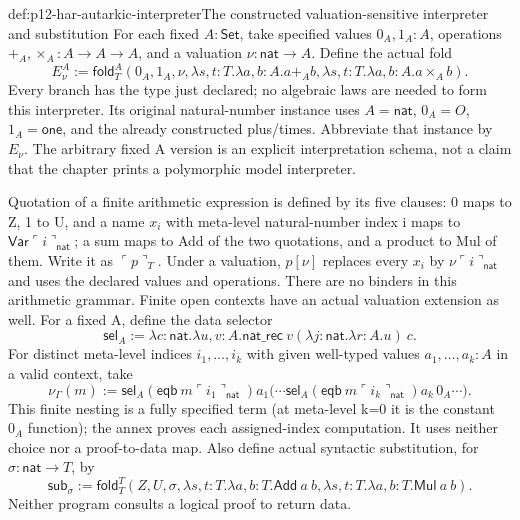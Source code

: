 \begin{hbdefinition}{def:p12-har-autarkic-interpreter}{The constructed valuation-sensitive interpreter and substitution}
For each fixed \(A:\mathsf{Set}\), take specified values
\(0_A,1_A:A\), operations \(+_A,\times_A:A\to A\to A\),
and a valuation \(\nu:\mathsf{nat}\to A\). Define the actual fold
\[
 E_\nu^A:=\mathsf{fold}_T^A
   (0_A,1_A,\nu,
    \lambda s,t:T.\lambda a,b:A.a+_A b,
    \lambda s,t:T.\lambda a,b:A.a\times_A b).
\]
Every branch has the type just declared; no algebraic laws are needed
to form this interpreter. Its original natural-number instance uses
\(A=\mathsf{nat}\), \(0_A=O\), \(1_A=\mathsf{one}\), and the
already constructed plus/times. Abbreviate that instance by \(E_\nu\).
The arbitrary fixed A version is an explicit interpretation schema,
not a claim that the chapter prints a polymorphic model interpreter.

Quotation of a finite arithmetic expression is defined by its five
clauses: 0 maps to Z, 1 to U, and a name \(x_i\) with meta-level
natural-number index i maps to
\(\mathsf{Var}\ulcorner i\urcorner_{\mathsf{nat}}\);
a sum maps to Add of the two quotations, and a product to Mul of them. Write it
as \(\ulcorner p\urcorner_T\). Under a valuation, \(p[\nu]\)
replaces every \(x_i\) by
\(\nu\ulcorner i\urcorner_{\mathsf{nat}}\) and uses the declared values
and operations. There are no binders in this arithmetic grammar.
Finite open contexts have an actual valuation extension as well. For a
fixed A, define the data selector
\[
 \mathsf{sel}_A:=\lambda c:\mathsf{nat}.\lambda u,v:A.
      \mathsf{nat\_rec}\ v
        (\lambda j:\mathsf{nat}.\lambda r:A.u)\ c.
\]
For distinct meta-level indices \(i_1,\ldots,i_k\) with given
well-typed values \(a_1,\ldots,a_k:A\) in a valid context, take
\[
 \nu_\Gamma(m):=
  \mathsf{sel}_A(\mathsf{eqb}\ m\ulcorner i_1\urcorner_{\mathsf{nat}})a_1
   \bigl(\cdots\mathsf{sel}_A
    (\mathsf{eqb}\ m\ulcorner i_k\urcorner_{\mathsf{nat}})a_k\,0_A\cdots\bigr).
\]
This finite nesting is a fully specified term (at meta-level k=0 it
is the constant \(0_A\) function); the annex proves each assigned-index
computation. It uses neither choice nor a proof-to-data map.
Also define actual syntactic substitution, for \(\sigma:\mathsf{nat}\to T\),
by
\[
 \mathsf{sub}_\sigma:=\mathsf{fold}_T^T
 (Z,U,\sigma,
    \lambda s,t:T.\lambda a,b:T.\mathsf{Add}\ a\ b,
    \lambda s,t:T.\lambda a,b:T.\mathsf{Mul}\ a\ b).
\]
Neither program consults a logical proof to return data.
\end{hbdefinition}

